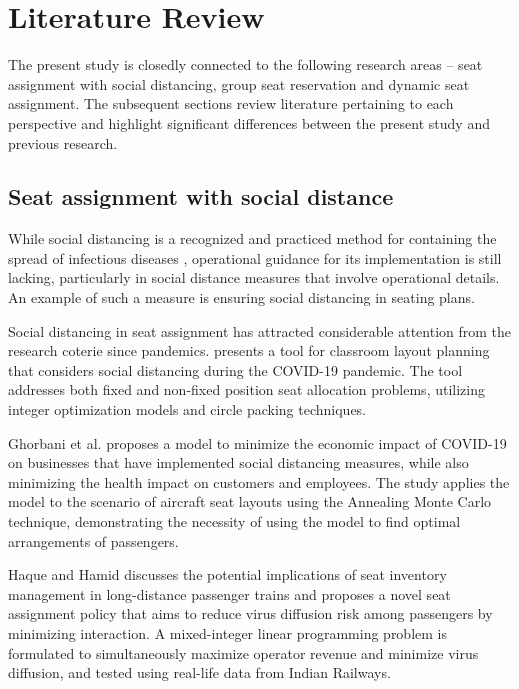 \section{Literature Review}

The present study is closedly connected to the following research areas -- seat assignment with social distancing, group seat reservation and dynamic seat assignment. The subsequent sections review literature pertaining to each perspective and highlight significant differences between the present study and previous research.

\subsection{Seat assignment with social distance}

While social distancing is a recognized and practiced method for containing the spread of infectious diseases \cite{moosa2020effectiveness}, operational guidance for its implementation is still lacking, particularly in social distance measures that involve operational details. An example of such a measure is ensuring social distancing in seating plans.

Social distancing in seat assignment has attracted considerable attention from the research coterie since pandemics.  \cite{bortolete2022support} presents a tool for classroom layout planning that considers social distancing during the COVID-19 pandemic. The tool addresses both fixed and non-fixed position seat allocation problems, utilizing integer optimization models and circle packing techniques.

Ghorbani et al. \cite{ghorbani2020model} proposes a model to minimize the economic impact of COVID-19 on businesses that have implemented social distancing measures, while also minimizing the health impact on customers and employees. The study applies the model to the scenario of aircraft seat layouts using the Annealing Monte Carlo technique, demonstrating the necessity of using the model to find optimal arrangements of passengers.


Haque and Hamid \cite{haque2022optimization} discusses the potential implications of seat inventory management in long-distance passenger trains and proposes a novel seat assignment policy that aims to reduce virus diffusion risk among passengers by minimizing interaction. A mixed-integer linear programming problem is formulated to simultaneously maximize operator revenue and minimize virus diffusion, and tested using real-life data from Indian Railways. 

